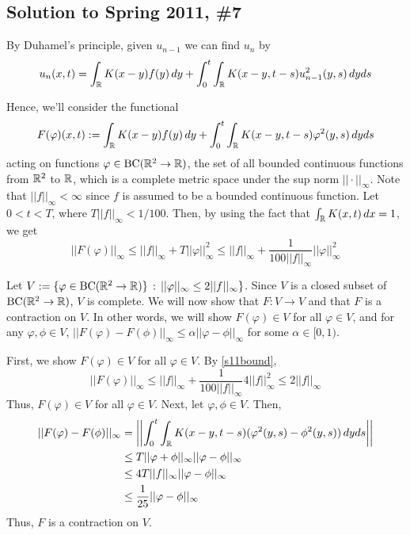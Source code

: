 \subsection*{Solution to Spring 2011, \#7}\label{s117}
By Duhamel's principle, given $u_{n-1}$ we can find $u_n$ by
\begin{equation}
\label{s11iter}
	u_n(x,t) = \int_{\mathbb{R}} K(x-y)f(y) \, dy + \int_0^t  \int_{\mathbb{R}} K(x-y,t-s) u_{n-1}^2(y,s) \, dy ds
\end{equation}

Hence, we'll consider the functional
$$ F(\varphi)(x,t) := \int_{\mathbb{R}} K(x-y)f(y) \, dy + \int_0^t \int_{\mathbb{R}} K(x-y,t-s) \varphi^2(y,s) \, dy ds $$
acting on functions $\varphi \in \text{BC}(\mathbb{R}^2 \to \mathbb{R})$, the set of all bounded continuous functions from $\mathbb{R}^2$ to $\mathbb{R}$, which is a complete metric space under the sup norm $|| \cdot ||_{\infty}$. Note that $||f||_{\infty} < \infty$ since $f$ is assumed to be a bounded continuous function. Let $0 < t < T$, where $T||f||_{\infty} < 1/100$. Then, by using the fact that $\int_{\mathbb{R}} K(x,t) \, dx = 1$, we get
\begin{equation}
\label{s11bound}
	||F(\varphi) ||_{\infty} \leq ||f||_{\infty} + T ||\varphi||_{\infty}^2 \leq ||f||_{\infty} + \frac{1}{100||f||_{\infty}} ||\varphi||_{\infty}^2
\end{equation}

Let $V := \{ \varphi \in \text{BC}(\mathbb{R}^2 \to \mathbb{R})\} \, : \, ||\varphi||_{\infty} \leq 2 ||f||_{\infty} \}$. Since $V$ is a closed subset of $\text{BC}(\mathbb{R}^2 \to \mathbb{R})$, $V$ is complete. We will now show that $F : V \to V$ and that $F$ is a contraction on $V$. In other words, we will show $F(\varphi) \in V$ for all $\varphi \in V$, and for any $\varphi, \phi \in V$, $||F(\varphi) - F(\phi)||_{\infty} \leq \alpha ||\varphi-\phi||_{\infty}$ for some $\alpha \in [0,1)$.

\vspace{0.2cm}

First, we show $F(\varphi) \in V$ for all $\varphi \in V$. By \eqref{s11bound},
$$||F(\varphi)||_{\infty} \leq ||f||_{\infty} + \frac{1}{100||f||_{\infty}} 4||f||_{\infty}^2 \leq 2 ||f||_{\infty} $$
Thus, $F(\varphi) \in V$ for all $\varphi \in V$. Next, let $\varphi, \phi \in V$. Then,
\begin{align*}
||F(\varphi) - F(\phi)||_{\infty} &= \left| \left| \int_0^t \int_{\mathbb{R}} K(x-y,t-s)(\varphi^2(y,s) - \phi^2(y,s)) \, dy ds \right| \right| \\
&\leq T ||\varphi + \phi||_{\infty} ||\varphi - \phi||_{\infty} \\
&\leq 4T ||f||_{\infty} ||\varphi - \phi||_{\infty} \\
&\leq \frac{1}{25} ||\varphi - \phi||_{\infty}
\end{align*}
Thus, $F$ is a contraction on $V$.

